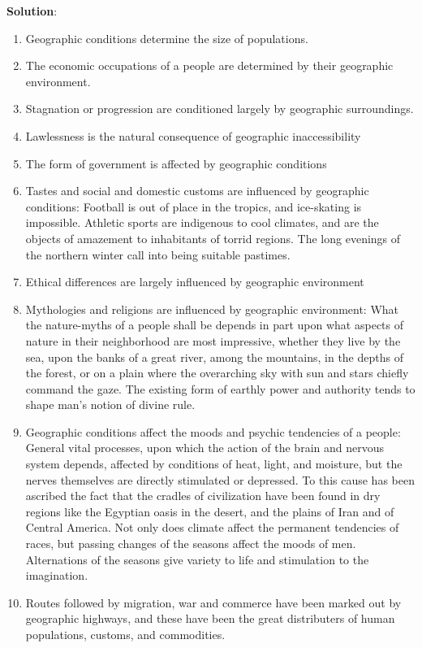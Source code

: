 \documentclass[
]{book}
\newenvironment{solution}{ {\bfseries Solution}:}{}
\begin{document}
\begin{questions}
\begin{solution}
\begin{enumerate}
\item Geographic conditions determine the size of populations.
\item The economic occupations of a people are determined by their geographic environment.
\item Stagnation or progression are conditioned largely by geographic surroundings.
\item Lawlessness is the natural consequence of geographic inaccessibility
\item The form of government is affected by geographic conditions
\item Tastes and social and domestic customs are influenced by geographic conditions: Football is out of place in the tropics, and ice-skating is impossible. Athletic sports are indigenous to cool climates, and are the objects of amazement to inhabitants of torrid regions. The long evenings of the northern winter call into being suitable pastimes.
\item Ethical differences are largely influenced by geographic environment
\item Mythologies and religions are influenced by geographic environment: What the nature-myths of a people shall be depends in part upon what aspects of nature in their neighborhood are most impressive, whether they live by the sea, upon the banks of a great river, among the mountains, in the depths of the forest, or on a plain where the overarching sky with sun and stars chiefly command the gaze. The existing form of earthly power and authority tends to shape man's notion of divine rule.
\item Geographic conditions affect the moods and psychic tendencies of a people: General vital processes, upon which the action of the brain and nervous system depends, affected by conditions of heat, light, and moisture, but the nerves themselves are directly stimulated or depressed. To this cause has been ascribed the fact that the cradles of civilization have been found in dry regions like the Egyptian oasis in the desert, and the plains of Iran and of Central America. Not only does climate affect the permanent tendencies of races, but passing changes of the seasons affect the moods of men. Alternations of the seasons give variety to life and stimulation to the imagination.
\item Routes followed by migration, war and commerce have been marked out by geographic highways, and these have been the great distributers of human populations, customs, and commodities.
\end{enumerate}


\end{solution}
\end{questions}
\end{document}
